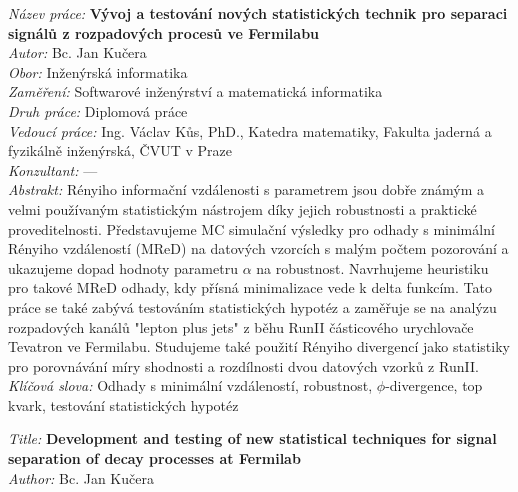 {
\setlength{\parindent}{0pt}

\textit{Název práce:}
\textbf{Vývoj a testování nových statistických technik pro separaci signálů z rozpadových procesů ve Fermilabu} \\

\textit{Autor:} Bc. Jan Kučera \\

\textit{Obor:} Inženýrská informatika \\

\textit{Zaměření:}  Softwarové inženýrství a matematická informatika \\

\textit{Druh práce:} Diplomová práce \\

\textit{Vedoucí práce:}  Ing. Václav Kůs, PhD., Katedra matematiky, Fakulta jaderná a fyzikálně inženýrská, ČVUT v Praze\\

\textit{Konzultant:}  --- \\

\textit{Abstrakt:} 
Rényiho informační vzdálenosti s parametrem jsou dobře známým a velmi používaným statistickým nástrojem díky jejich robustnosti a praktické proveditelnosti. Představujeme MC simulační výsledky pro odhady s minimální Rényiho vzdáleností (MReD) na datových vzorcích s malým počtem pozorování a ukazujeme dopad hodnoty parametru $\alpha$ na robustnost. Navrhujeme heuristiku pro takové MReD odhady,  kdy přísná minimalizace vede k delta funkcím. Tato práce se také zabývá testováním statistických hypotéz a zaměřuje se na analýzu rozpadových kanálů "lepton plus jets" z běhu RunII částicového urychlovače Tevatron ve Fermilabu. Studujeme také použití Rényiho divergencí jako statistiky pro porovnávání míry shodnosti a rozdílnosti dvou datových vzorků z RunII.\\

\textit{Klíčová slova:}  Odhady s minimální vzdáleností, robustnost, $\phi$-divergence, top kvark, testování statistických hypotéz

\vspace{1.4cm}

\textit{Title:}
\textbf{Development and testing of new statistical techniques for signal separation of decay processes at Fermilab} \\

\textit{Author:} Bc. Jan Kučera\\

}
